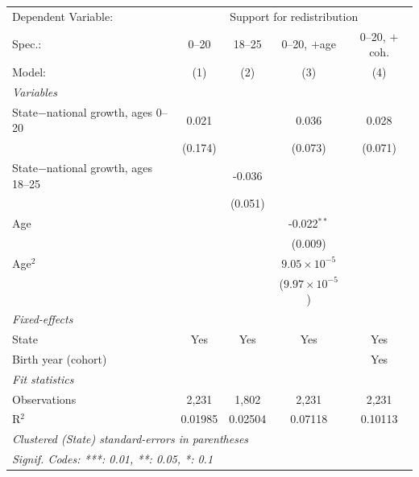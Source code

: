    \begin{tabular}{lcccc}
      \tabularnewline \midrule \midrule
      Dependent Variable: & \multicolumn{4}{c}{Support for redistribution}\\
      Spec.:                               & 0--20   & 18--25  & 0--20, $+$age           & 0--20, $+$coh. \\   
      Model:                               & (1)     & (2)     & (3)                     & (4)\\  
      \midrule
      \emph{Variables}\\
      State$-$national growth, ages 0--20  & 0.021   &         & 0.036                   & 0.028\\   
                                           & (0.174) &         & (0.073)                 & (0.071)\\   
      State$-$national growth, ages 18--25 &         & -0.036  &                         &   \\   
                                           &         & (0.051) &                         &   \\   
      Age                                  &         &         & -0.022$^{**}$           &   \\   
                                           &         &         & (0.009)                 &   \\   
      Age$^2$                              &         &         & $9.05\times 10^{-5}$    &   \\   
                                           &         &         & ($9.97\times 10^{-5}$)  &   \\   
      \midrule
      \emph{Fixed-effects}\\
      State                                & Yes     & Yes     & Yes                     & Yes\\  
      Birth year (cohort)                  &         &         &                         & Yes\\  
      \midrule
      \emph{Fit statistics}\\
      Observations                         & 2,231   & 1,802   & 2,231                   & 2,231\\  
      R$^2$                                & 0.01985 & 0.02504 & 0.07118                 & 0.10113\\  
      \midrule \midrule
      \multicolumn{5}{l}{\emph{Clustered (State) standard-errors in parentheses}}\\
      \multicolumn{5}{l}{\emph{Signif. Codes: ***: 0.01, **: 0.05, *: 0.1}}\\
   \end{tabular}
\vspace{2pt}\par{}
